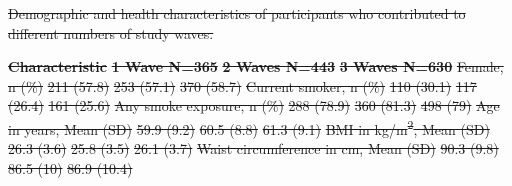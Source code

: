 \documentclass[
  letterpaper,
  DIV=11,
  numbers=noendperiod]{scrartcl}
\makeatletter
\renewenvironment{table}%
   {\renewcommand\familydefault\sfdefault
    \@float{table}}
   {\end@float}
\providecommand{\DIFdeltex}[1]{{\protect\color{red}\sout{#1}}}                      %
\providecommand{\DIFdelend}{} %
\providecommand{\DIFdelFL}[1]{\DIFdel{#1}} %
\providecommand{\DIFdelbeginFL}{} %
\providecommand{\DIFdelendFL}{} %
\providecommand{\DIFdel}[1]{\texorpdfstring{\DIFdeltex{#1}}{}} %
\newcommand{\DIFscaledelfig}{0.5}
\newlength{\DIFdelgraphicswidth} %
\newlength{\DIFdelgraphicsheight} %
\newcommand{\DIFdelincludegraphics}[2][]{%
\sbox{\DIFdelgraphicsbox}{\DIFOincludegraphics[#1]{#2}}%
\settoboxwidth{\DIFdelgraphicswidth}{\DIFdelgraphicsbox} %
\settoboxtotalheight{\DIFdelgraphicsheight}{\DIFdelgraphicsbox} %
\scalebox{\DIFscaledelfig}{%
\parbox[b]{\DIFdelgraphicswidth}{\usebox{\DIFdelgraphicsbox}\\[-\baselineskip] \rule{\DIFdelgraphicswidth}{0em}}\llap{\resizebox{\DIFdelgraphicswidth}{\DIFdelgraphicsheight}{%
\setlength{\unitlength}{\DIFdelgraphicswidth}%
\begin{picture}(1,1)%
\thicklines\linethickness{2pt} %
{\color[rgb]{1,0,0}\put(0,0){\framebox(1,1){}}}%
{\color[rgb]{1,0,0}\put(0,0){\line( 1,1){1}}}%
{\color[rgb]{1,0,0}\put(0,1){\line(1,-1){1}}}%
\end{picture}%
}\hspace*{3pt}}} %
} %
\DeclareRobustCommand{\DIFdelend}{\DIFOaddend \let\includegraphics\DIFOincludegraphics} %
\DeclareRobustCommand{\DIFdelbeginFL}{\DIFOdelbeginFL \let\includegraphics\DIFdelincludegraphics} %
\DeclareRobustCommand{\DIFdelendFL}{\DIFOaddendFL \let\includegraphics\DIFOincludegraphics} %
\makeatother
\begin{document}
\DIFdelend \begin{table}
\DIFdelbeginFL %
{%
\DIFdelFL{Demographic and health characteristics of participants who contributed
to different numbers of study waves. }}%

\DIFdelendFL \centering\DIFdelbeginFL %
\textbf{\DIFdelFL{Characteristic}} %
\textbf{\DIFdelFL{1 Wave N=365}} %
\textbf{\DIFdelFL{2 Waves N=443}} %
\textbf{\DIFdelFL{3 Waves N=630}}%
\DIFdelFL{Female, n (\%) }%
\DIFdelFL{211 (57.8) }%
\DIFdelFL{253 (57.1) }%
\DIFdelFL{370 (58.7)}%
\DIFdelFL{Current smoker, n (\%) }%
\DIFdelFL{110 (30.1) }%
\DIFdelFL{117 (26.4) }%
\DIFdelFL{161 (25.6)}%
\DIFdelFL{Any smoke exposure, n (\%) }%
\DIFdelFL{288 (78.9) }%
\DIFdelFL{360 (81.3) }%
\DIFdelFL{498 (79)}%
\DIFdelFL{Age in years, Mean (SD) }%
\DIFdelFL{59.9 (9.2) }%
\DIFdelFL{60.5 (8.8) }%
\DIFdelFL{61.3 (9.1)}%
\DIFdelFL{BMI in kg/m\textsuperscript{2}, Mean (SD) }%
\DIFdelFL{26.3 (3.6) }%
\DIFdelFL{25.8 (3.5) }%
\DIFdelFL{26.1 (3.7)}%
\DIFdelFL{Waist circumference in cm, Mean (SD) }%
\DIFdelFL{90.3 (9.8) }%
\DIFdelFL{86.5 (10) }%
\DIFdelFL{86.9 (10.4)}%


\end{table}
\end{document}
